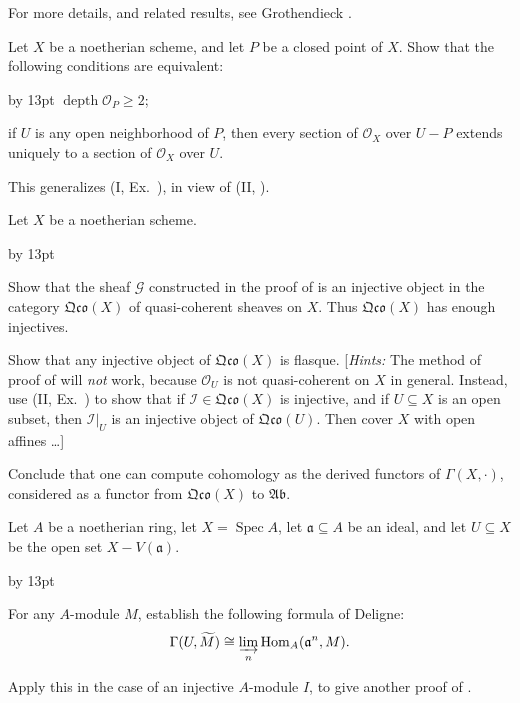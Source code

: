 {{{\smallskip
\noindent For more details, and related results, see Grothendieck .\par}

\smallskip
\noindent\hypertarget{ex-III-3.5}{}Let $X$ be a noetherian scheme, and let $P$ be a closed point of $X$. Show that the following conditions are equivalent:

\smallskip
{\advance\leftskip by 13pt
\noindent\hypertarget{ex-III-3.5i}{}$\operatorname{depth}\mathcal O_P\geq2$;

\noindent\hypertarget{ex-III-3.5ii}{}if $U$ is any open neighborhood of $P$, then every section of $\mathcal O_X$ over $U-P$ extends uniquely to a section of $\mathcal O_X$ over $U$.\par}

\smallskip
\noindent This generalizes (I, Ex.~), in view of (II, ).

\smallskip
\noindent\hypertarget{ex-III-3.6}{}Let $X$ be a noetherian scheme.
{\advance\leftskip by 13pt\par
\noindent\hypertarget{ex-III-3.6a}{}Show that the sheaf $\mathcal G$ constructed in the proof of  is an injective object in the category $\mathfrak{Qco}(X)$ of quasi-coherent sheaves on $X$. Thus $\mathfrak{Qco}(X)$ has enough injectives.

\noindent\hypertarget{ex-III-3.6b}{}Show that any injective object of $\mathfrak{Qco}(X)$ is flasque. [\emph{Hints:} The method of proof of  will \emph{not} work, because $\mathcal O_U$ is not quasi-coherent on $X$ in general. Instead, use (II, Ex.~) to show that if $\mathcal I\in\mathfrak{Qco}(X)$ is injective, and if $U\subseteq X$ is an open subset, then $\mathcal I|_U$ is an injective object of $\mathfrak{Qco}(U)$. Then cover $X$ with open affines \ldots{}]

\noindent\hypertarget{ex-III-3.6c}{}Conclude that one can compute cohomology as the derived functors of $\Gamma(X,\cdot)$, considered as a functor from $\mathfrak{Qco}(X)$ to $\mathfrak{Ab}$.\par}

\smallskip
\noindent\hypertarget{ex-III-3.7}{}Let $A$ be a noetherian ring, let $X=\operatorname{Spec}A$, let $\mathfrak a\subseteq A$ be an ideal, and let $U\subseteq X$ be the open set $X-V(\mathfrak a)$.
{\advance\leftskip by 13pt\par
\noindent\hypertarget{ex-III-3.7a}{}For any $A$-module $M$, establish the following formula of Deligne:
\[
\Gamma(U,\widetilde M)\cong\varinjlim_n\operatorname{Hom}_A(\mathfrak a^n,M).
\]

\noindent\hypertarget{ex-III-3.7b}{}Apply this in the case of an injective $A$-module $I$, to give another proof of .\par}\par}
}
